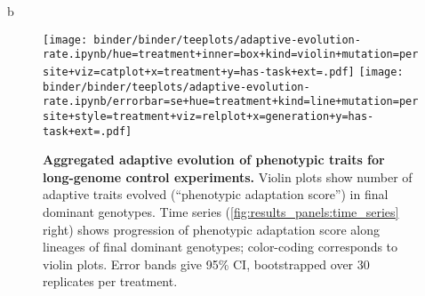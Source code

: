 b\begin{figure*}
    \centering
    \texttt{[image: binder/binder/teeplots/adaptive-evolution-rate.ipynb/hue=treatment+inner=box+kind=violin+mutation=per site+viz=catplot+x=treatment+y=has-task+ext=.pdf]}%
    \texttt{[image: binder/binder/teeplots/adaptive-evolution-rate.ipynb/errorbar=se+hue=treatment+kind=line+mutation=per site+style=treatment+viz=relplot+x=generation+y=has-task+ext=.pdf]}
    \caption{
        \textbf{Aggregated adaptive evolution of phenotypic traits for long-genome control experiments.}
        \small Violin plots show number of adaptive traits evolved (``phenotypic adaptation score'') in final dominant genotypes.
        Time series (\ref{fig:results_panels:time_series} right) shows progression of phenotypic adaptation score along lineages of final dominant genotypes; color-coding corresponds to violin plots.
        Error bands give 95\% CI, bootstrapped over 30 replicates per treatment.
    }
    \label{fig:adaptive-evolution-rate-agg}
\end{figure*}
